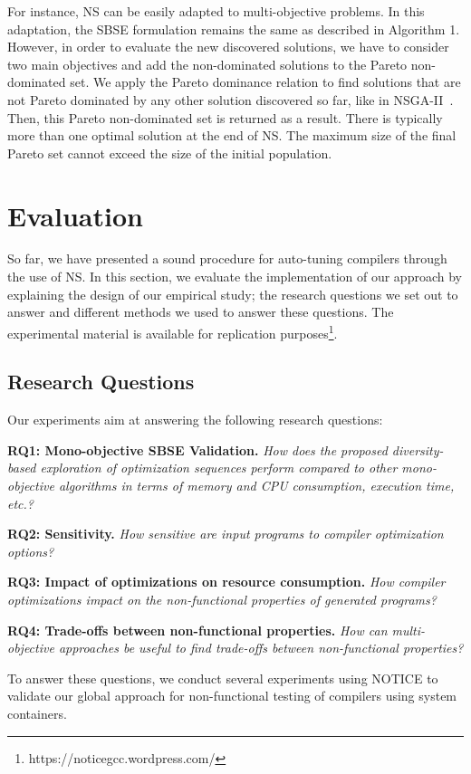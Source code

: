 For instance, NS can be easily adapted to multi-objective problems. In this adaptation, the SBSE formulation remains the same as described in Algorithm 1. However, in order to evaluate the new discovered solutions, we have to consider two main objectives and add the non-dominated solutions to the Pareto non-dominated set. We apply the Pareto dominance relation to find solutions that are not Pareto dominated by any other solution discovered so far, like in NSGA-II~\cite{lokuciejewski2010multi, deb2002fast}. Then, this Pareto non-dominated set is returned as a result.
There is typically more than one optimal solution at the end of NS. The maximum size of the final Pareto set cannot exceed the size of the initial population.


\section{Evaluation}
So far, we have presented a sound procedure for auto-tuning compilers through the use of NS. In this section, we evaluate the implementation of our approach by explaining the design of our empirical study; the research questions we set out to answer and different methods we used to answer these questions. The experimental material is available for replication purposes\footnote{https://noticegcc.wordpress.com/}.

\subsection{Research Questions}
Our experiments aim at answering the following research questions:

\textbf{RQ1: Mono-objective SBSE Validation.} 
\textit{How does the proposed diversity-based exploration of optimization sequences perform compared to other mono-objective algorithms in terms of memory and CPU consumption, execution time, etc.?} 


\textbf{RQ2: Sensitivity.} 
\textit{How sensitive are input programs to compiler optimization options?}


\textbf{RQ3: Impact of optimizations on resource consumption.} 
\textit{How compiler optimizations impact on the non-functional properties of generated programs?}


\textbf{RQ4: Trade-offs between non-functional properties.} 
\textit{How can multi-objective approaches be useful to find trade-offs between non-functional properties?}

To answer these questions, we conduct several experiments using NOTICE to validate our global approach for non-functional testing of compilers using system containers.


